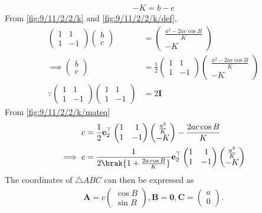 \documentclass[10pt,a4paper]{report}
\newcommand{\myvec}[1]{\ensuremath{\begin{pmatrix}#1\end{pmatrix}}}
\let\vec\mathbf
\begin{document}
\begin{multicols}{2}
\begin{align}
-K = b-c 
		\label{fig:9/11/2/2/k/def}
\end{align}
From 
		\eqref{fig:9/11/2/2/k}
		and
		\eqref{fig:9/11/2/2/k/def},
\begin{align}
	\myvec{
		1 & 1
		\\
		1 & -1 
	}
	\myvec{
	b
	\\
	c
	}
	&=
	\myvec{
		\frac{{a}^2- 2  a  c\cos{B}}{K}
		\\
-K}
\\
\implies
	\myvec{
	b
	\\
	c
	}
	&=
	\frac{1}{2}\myvec{
		1 & 1
		\\
		1 & -1 
	}
	\myvec{
		\frac{{a}^2- 2  a  c\cos{B}}{K}
	\\
-K}
		\label{fig:9/11/2/2/k/mateq}
\\
\because
\myvec{
		1 & 1
		\\
		1 & -1 }
	\myvec{
		1 & 1
		\\
		1 & -1 }
	&	= 	{2}\vec{I}
\end{align}
From 
		\eqref{fig:9/11/2/2/k/mateq}
\begin{align}
	c
	&=
	\frac{1}{2}\vec{e}_2^{\top}\myvec{
		1 & 1
		\\
		1 & -1 
	}
	\myvec{
		\frac{{a}^2}{K}
	\\
	-K}- \frac{2  a  c\cos{B}}{K}
\\
\implies
	c &=
	\frac{1}{2\brak{1+ \frac{2  a  \cos{B}}{K}}}\vec{e}_2^{\top}\myvec{
		1 & 1
		\\
		1 & -1 
	}
	\myvec{
		\frac{{a}^2}{K}
	\\
-K}
\end{align}
The coordinates of $\triangle ABC$ can then be expressed as
\begin{align}
	\vec{A}=c\myvec{\cos B \\ \sin B},
	\vec{B} = \vec{0},
	\vec{C} =\myvec{a \\ 0}.
\end{align}

	\iffalse

\end{multicols}
\end{document}
